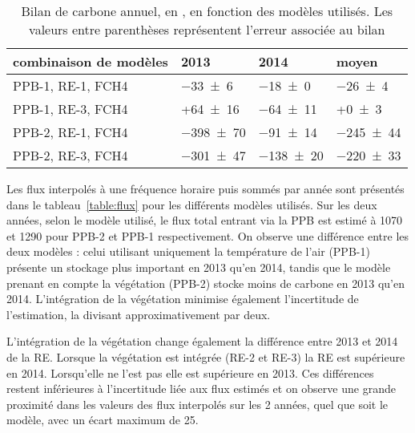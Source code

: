 \begin{table}
\centering
\caption{Bilan de carbone annuel, en \si{\gcma}, en fonction des modèles utilisés. Les valeurs entre parenthèses représentent l'erreur associée au bilan}
\label{table:bdc}
\begin{tabular}{llll}\toprule
combinaison de modèles & 2013 & 2014 & moyen \\ \midrule
PPB-1, RE-1, FCH4 &  \num{-33(6)} & \num{-18(0)} & \num{-26(4)} \\
PPB-1, RE-3, FCH4 &  +\num{64(16)} & \num{-64(11)} & +\num{0(3)} \\
PPB-2, RE-1, FCH4 &  \num{-398(70)} & \num{-91(14)} & \num{-245(44)} \\
PPB-2, RE-3, FCH4 &  \num{-301(47)} & \num{-138(20)} & \num{-220(33)} \\
\bottomrule
\end{tabular}
\end{table}

Les flux interpolés à une fréquence horaire puis sommés par année sont présentés dans le tableau~\ref{table:flux} pour les différents modèles utilisés.
Sur les deux années, selon le modèle utilisé, le flux total entrant via la PPB est estimé à 1070 et \SI{1290}{\gcma} pour PPB-2 et PPB-1 respectivement.
On observe une différence entre les deux modèles : 
celui utilisant uniquement la température de l'air (PPB-1) présente un stockage plus important en 2013 qu'en 2014, tandis que le modèle prenant en compte la végétation (PPB-2) stocke moins de carbone en 2013 qu'en 2014.
L'intégration de la végétation minimise également l'incertitude de l'estimation, la divisant approximativement par deux.

L'intégration de la végétation change également la différence entre 2013 et 2014 de la RE.
Lorsque la végétation est intégrée (RE-2 et RE-3) la RE est supérieure en 2014.
Lorsqu'elle ne l'est pas elle est supérieure en 2013.
Ces différences restent inférieures à l'incertitude liée aux flux estimés et on observe une grande proximité dans les valeurs des flux interpolés sur les 2 années, quel  que soit le modèle, avec un écart maximum de \SI{25}{\gcma}.


